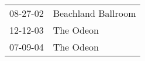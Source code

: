 \begin{supertabular}{p{0.25\columnwidth}p{0.75\columnwidth}}
 08-27-02 &  Beachland Ballroom \\
 12-12-03 &           The Odeon \\
 07-09-04 &           The Odeon \\
\end{supertabular}
